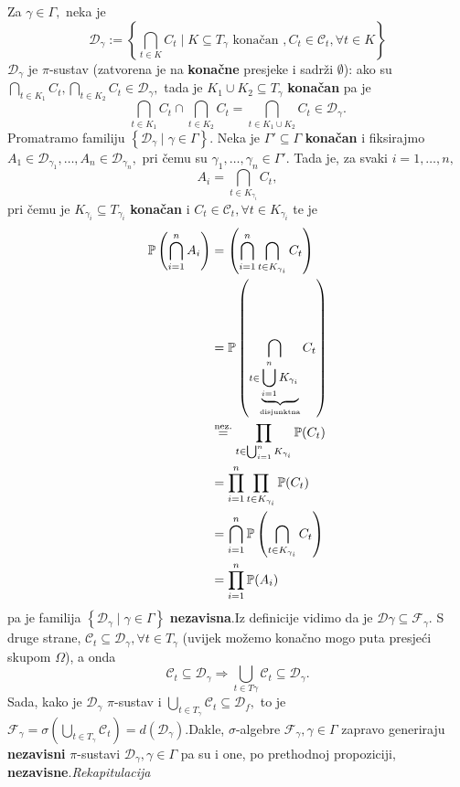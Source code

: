 \documentclass{article}
\begin{document}
Za \(\gamma\in\Gamma,\) neka je \[\mathcal D_\gamma:=\left\{\bigcap_{t\in K}C_t\mid K\subseteq T_\gamma\text{ konačan }, C_t\in\mathcal C_t,\forall t\in K\right\}\] \(\mathcal D_\gamma\) je \(\pi\)-sustav (zatvorena je na \textbf{konačne} presjeke i sadrži \(\emptyset\)): ako su \(\bigcap_{t\in K_1}C_t,\bigcap_{t\in K_2}C_t\in\mathcal D_\gamma,\) tada je \(K_1\cup K_2\subseteq T_\gamma\) \textbf{konačan} pa je \[\bigcap_{t\in K_1}C_t\cap\bigcap_{t\in K_2}C_t=\bigcap_{t\in K_1\cup K_2}C_t\in\mathcal D_\gamma.\] Promatramo familiju \(\left\{\mathcal D_\gamma\mid\gamma\in\Gamma\right\}.\) Neka je \(\Gamma'\subseteq\Gamma\) \textbf{konačan} i fiksirajmo \(A_1\in\mathcal D_{\gamma_1},\ldots, A_n\in\mathcal D_{\gamma_n},\) pri čemu su \(\gamma_1,\ldots,\gamma_n\in\Gamma'.\) Tada je, za svaki \(i=1,\ldots,n,\) \[A_i=\bigcap_{t\in K_{\gamma_i}}C_t,\] pri čemu je \(K_{\gamma_i}\subseteq T_{\gamma_i}\) \textbf{konačan} i \(C_t\in\mathcal C_t,\forall t\in K_{\gamma_i}\) te je \[\begin{aligned}\Bbb P\left(\bigcap_{i=1}^nA_i\right)&=\left(\bigcap_{i=1}^n\bigcap_{t\in K_{\gamma_i}}C_t\right)\\&=\Bbb P\left(\bigcap_{t\in \small{\underbrace{\bigcup_{i=1}^nK_{\gamma_i}}_{\text{disjunktna}}}}C_t\right)\\&\overset{\text{nez.}}{=}\prod_{t\in\bigcup_{i=1}^nK_{\gamma_i}}\Bbb P(C_t)\\&=\prod_{i=1}^n\prod_{t\in K_{\gamma_i}}\Bbb P(C_t)\\&=\bigcap_{i=1}^n\Bbb P\left(\bigcap_{t\in K_{\gamma_i}}C_t\right)\\&=\prod_{i=1}^n\Bbb P(A_i)\end{aligned}\] pa je familija \(\left\{\mathcal D_\gamma\mid\gamma\in\Gamma\right\}\) \textbf{nezavisna}.\newline Iz definicije vidimo da je \(\mathcal D\gamma\subseteq\mathcal F_\gamma.\)  S druge strane, \(\mathcal C_t\subseteq\mathcal D_\gamma,\forall t\in T_\gamma\) (uvijek možemo konačno mogo puta presjeći skupom \(\Omega\)), a onda \[\mathcal C_t\subseteq\mathcal D_\gamma\Rightarrow\bigcup_{t\in T\gamma}\mathcal C_t\subseteq\mathcal D_\gamma.\] Sada, kako je \(\mathcal D_\gamma\) \(\pi\)-sustav i \(\bigcup_{t\in T_\gamma}\mathcal C_t\subseteq\mathcal D_f,\) to je \(\mathcal F_\gamma=\sigma\left(\bigcup_{t\in T_\gamma}\mathcal C_t\right)=d\left(\mathcal D_\gamma\right).\)\newline Dakle, \(\sigma\)-algebre \(\mathcal F_\gamma,\gamma\in\Gamma\) zapravo generiraju \textbf{nezavisni} \(\pi\)-sustavi \(\mathcal D_\gamma,\gamma\in\Gamma\) pa su i one, po prethodnoj propoziciji, \textbf{nezavisne}.\newline\newline\textit{Rekapitulacija}
\end{document}
